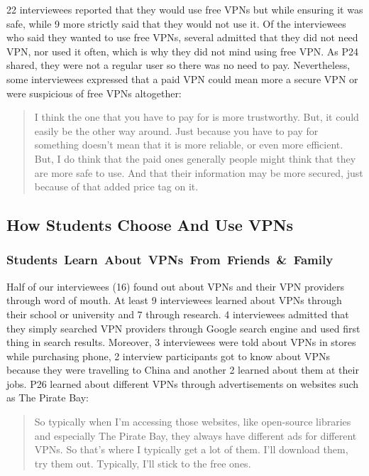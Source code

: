  22 interviewees reported that they would use free VPNs but while ensuring it was safe,
while 9 more strictly said that they would not use it. Of the interviewees who said they wanted to use free VPNs, several admitted that they did not need VPN, nor used it often, which
is why they did not mind using free VPN.  As P24 shared, they were not a regular user so there was no need to pay.
Nevertheless, some interviewees expressed that a paid VPN could mean more a secure VPN or were suspicious of free VPNs altogether: \begin{quote} I think the
one that you have to pay for is more trustworthy. But, it could easily be the
other way around. Just because you have to pay for something doesn't mean that
it is more reliable, or even more efficient. But, I do think that the paid
ones generally people might think that they are more safe to use. And that
their information may be more secured, just because of that added price tag on
it.\end{quote}



\subsection{How Students Choose And Use VPNs }


\subsubsection{\mbox{Students Learn About VPNs From Friends \& Family}} 

Half of our interviewees (16) found out about
VPNs and their VPN providers through word of mouth. At
least 9 interviewees learned about VPNs through their school or university and
7 through research. 4 interviewees admitted that they simply searched VPN
providers through Google search engine and used first thing in
search results. Moreover, 3 interviewees were told about VPNs in stores while
purchasing phone, 2 interview participants got to know about VPNs because they
were travelling to China and another 2 learned about them at their jobs. P26 learned about different VPNs through advertisements on websites such as
The Pirate Bay: \begin{quote}So typically when I'm accessing those websites,
    like open-source libraries and especially The Pirate Bay, they always have
    different ads for different VPNs. So that's where I typically get a lot of
    them. I'll download them, try them out. Typically, I'll stick to the free
    ones.\end{quote}

